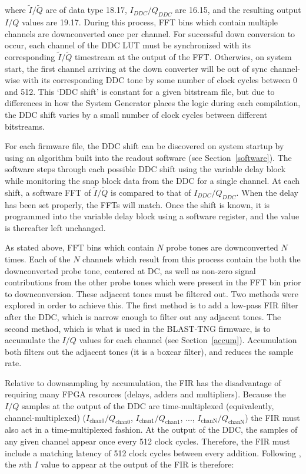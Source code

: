 where $\widetilde{I}/\widetilde{Q}$ are of data type 18.17, $I_{DDC}/Q_{DDC}$ are 16.15, and the resulting output $I/Q$ values are 19.17. During this process, FFT bins which contain multiple channels are downconverted once per channel. For successful down conversion to occur, each channel of the DDC LUT must be synchronized with its corresponding $\widetilde{I}/\widetilde{Q}$ timestream at the output of the FFT. Otherwies, on system start, the first channel arriving at the down converter will be out of sync channel-wise with its corresponding DDC tone by some number of clock cycles between 0 and 512. This `DDC shift' is constant for a given bitstream file, but due to differences in how the System Generator places the logic during each compilation, the DDC shift varies by a small number of clock cycles between different bitstreams.

For each firmware file, the DDC shift can be discovered on system startup by using an algorithm built into the readout software (see Section~\ref{software}). The software steps through each possible DDC shift using the variable delay block while monitoring the snap block data from the DDC for a single channel. At each shift, a software FFT of $\widetilde{I}/\widetilde{Q}$ is compared to that of $I_{DDC}/Q_{DDC}$. When the delay has been set properly, the FFTs will match. Once the shift is known, it is programmed into the variable delay block using a software register, and the value is thereafter left unchanged.

As stated above, FFT bins which contain $N$ probe tones are downconverted $N$ times. Each of the $N$ channels which result from this process contain the both the downconverted probe tone, centered at DC, as well as non-zero signal contributions from the other probe tones which were present in the FFT bin prior to downconversion. These adjacent tones must be filtered out. Two methods were explored in order to achieve this. The first method is to add a low-pass FIR filter after the DDC, which is narrow enough to filter out any adjacent tones. The second method, which is what is used in the BLAST-TNG firmware, is to accumulate the $I/Q$ values for each channel (see Section~\ref{accum}). Accumulation both filters out the adjacent tones (it is a boxcar filter), and reduces the sample rate.

Relative to downsampling by accumulation, the FIR has the disadvantage of requiring many FPGA resources (delays, adders and multipliers). Because the $I/Q$ samples at the output of the DDC are time-multiplexed (equivalently, channel-multiplexed) ($I_{\mathrm{chan0}}/Q_{\mathrm{chan0}}$, $I_{\mathrm{chan1}}/Q_{\mathrm{chan1}}$, ..., $I_{\mathrm{chanN}}/Q_{\mathrm{chanN}}$) the FIR must also act in a time-multiplexed fashion. At the output of the DDC, the samples of any given channel appear once every 512 clock cycles. Therefore, the FIR must include a matching latency of 512 clock cycles between every addition. Following \citet{strader2016digitial}, the $n$th $I$ value to appear at the output of the FIR is therefore:

